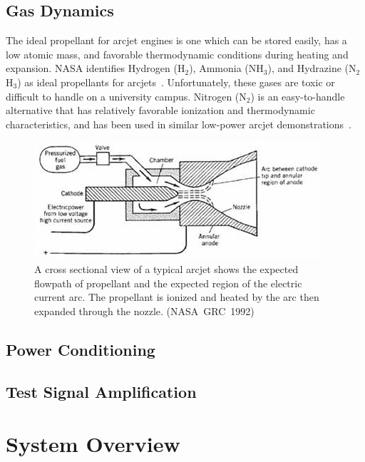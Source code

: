 \documentclass[journal]{IEEEtran}
\begin{document}
\subsection{Gas Dynamics}
The ideal propellant for arcjet engines is one which can be stored easily, has a low atomic mass, and favorable thermodynamic conditions during heating and expansion.
NASA identifies Hydrogen (H$_{2}$), Ammonia (NH$_{3}$), and Hydrazine (N$_{2}$H$_{3}$) as ideal propellants for arcjets~\cite{nasa1}.
Unfortunately, these gases are toxic or difficult to handle on a university campus.
Nitrogen (N$_{2}$) is an easy-to-handle alternative that has relatively favorable ionization and thermodynamic characteristics, and has been used in similar low-power arcjet demonstrations~\cite{olin,olinsim}.
\begin{figure}[htp]
  \centering
  \includegraphics[width=\linewidth]{figs/cross-section_nasa}
  \caption[Arcjet cross-section]{A cross sectional view of a typical arcjet shows the expected flowpath of propellant and the expected region of the electric current arc. The propellant is ionized and heated by the arc then expanded through the nozzle. (NASA~GRC~1992)
\label{fig:x-section-sutton}}
\end{figure}

\subsection{Power Conditioning}

\subsection{Test Signal Amplification}

\section{System Overview}
\end{document}

